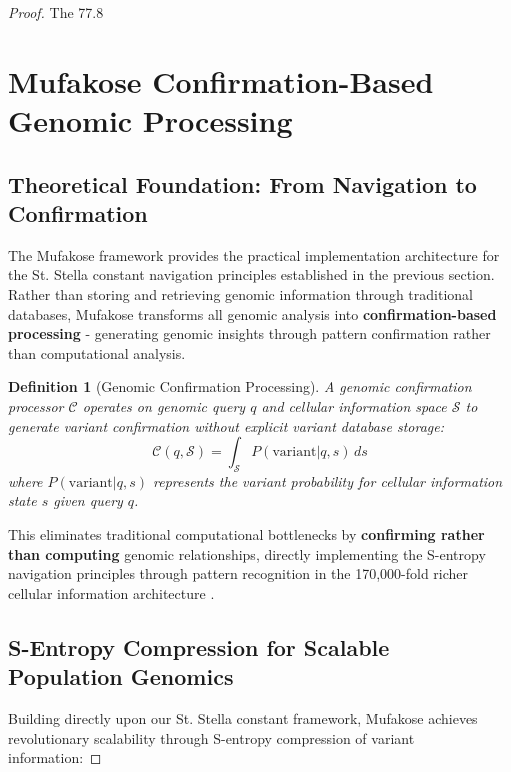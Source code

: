 \documentclass[12pt,a4paper]{article}
\newtheorem{definition}[theorem]{Definition}
\begin{document}
\begin{proof}
The 77.8%

\section{Mufakose Confirmation-Based Genomic Processing}

\subsection{Theoretical Foundation: From Navigation to Confirmation}

The Mufakose framework provides the practical implementation architecture for the St. Stella constant navigation principles established in the previous section. Rather than storing and retrieving genomic information through traditional databases, Mufakose transforms all genomic analysis into \textbf{confirmation-based processing} - generating genomic insights through pattern confirmation rather than computational analysis.

\begin{definition}[Genomic Confirmation Processing]
A genomic confirmation processor $\mathcal{C}$ operates on genomic query $q$ and cellular information space $\mathcal{S}$ to generate variant confirmation without explicit variant database storage:
$$\mathcal{C}(q,\mathcal{S}) = \int_{\mathcal{S}} P(\text{variant}|q,s) \, ds$$
where $P(\text{variant}|q,s)$ represents the variant probability for cellular information state $s$ given query $q$.
\end{definition}

This eliminates traditional computational bottlenecks by \textbf{confirming rather than computing} genomic relationships, directly implementing the S-entropy navigation principles through pattern recognition in the 170,000-fold richer cellular information architecture \cite{mckenna2010genome, poplin2018universal}.

\subsection{S-Entropy Compression for Scalable Population Genomics}

Building directly upon our St. Stella constant framework, Mufakose achieves revolutionary scalability through S-entropy compression of variant information:


\end{proof}
\end{document}
